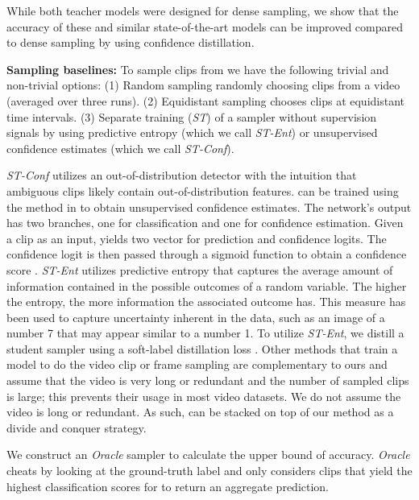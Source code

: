 \documentclass[a4paper,conference]{IEEEtran}
\begin{document}
While both teacher models were designed for dense sampling, we show that the accuracy of these and similar state-of-the-art models can be improved compared to dense sampling by using confidence distillation.

{\bf Sampling baselines:} To sample  clips from  we have the following trivial and non-trivial options: (1) Random sampling randomly choosing  clips from a video (averaged over three runs). (2) Equidistant sampling chooses  clips at equidistant time intervals. (3) Separate training (\textit{ST}) of a sampler without supervision signals by using predictive entropy (which we call \textit{ST-Ent}) or unsupervised confidence estimates \cite{devries2018learning} (which we call \textit{ST-Conf}). 

\textit{ST-Conf} utilizes an out-of-distribution detector with the intuition that ambiguous clips likely contain out-of-distribution features.  can be trained using the method in \cite{devries2018learning} to obtain unsupervised confidence estimates. The network's output has two branches, one for classification and one for confidence estimation. Given a clip  as an input,  yields two vector for prediction and confidence logits. The confidence logit is then passed through a sigmoid function to obtain a confidence score . \textit{ST-Ent} utilizes predictive entropy \cite{shannon1948mathematical} that captures the average amount of information contained in the possible outcomes of a random variable. The higher the entropy, the more information the associated outcome has. This measure has been used \cite{gal2016uncertainty, hein2019relu} to capture uncertainty inherent in the data, such as an image of a number 7 that may appear similar to a number 1. To utilize \textit{ST-Ent}, we distill a student sampler using a soft-label distillation loss \cite{hinton2015distilling}. Other methods that train a model to do the video clip or frame sampling \cite{korbar2019scsampler, gao2020listen, wu2019adaframe} are complementary to ours and assume that the video is very long or redundant and the number of sampled clips is large; this prevents their usage in most video datasets. We do not assume the video is long or redundant. As such, \cite{gao2020listen, korbar2019scsampler, wu2019adaframe} can be stacked on top of our method as a divide and conquer strategy.

We construct an \textit{Oracle} sampler \cite{korbar2019scsampler} to calculate the upper bound of accuracy. \textit{Oracle} cheats by looking at the ground-truth label  and only considers clips that yield the  highest classification scores for  to return an aggregate prediction.
\end{document}
